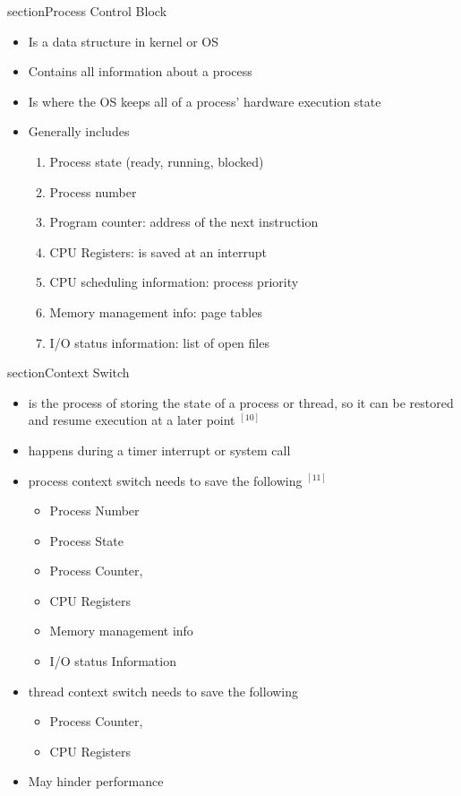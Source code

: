 \documentclass[12pt]{article}
\begin{document}
\*section{Process Control Block}

\begin{itemize}
    \item Is a data structure in kernel or OS
    \item Contains all information about a process
    \item Is where the OS keeps all of a process' hardware execution state
    \item Generally includes

    \begin{enumerate}[1.]
        \item Process state (ready, running, blocked)
        \item Process number
        \item Program counter: address of the next instruction
        \item CPU Registers: is saved at an interrupt
        \item CPU scheduling information: process priority
        \item Memory management info: page tables
        \item I/O status information: list of open files
    \end{enumerate}
\end{itemize}

\*section{Context Switch}

\begin{itemize}
    \item is the process of storing the state of a process or thread,
    so it can be restored and resume execution at a later point $^{[10]}$
    \item happens during a timer interrupt or system call
    \item process context switch needs to save the following $^{[11]}$

    \begin{itemize}
        \item Process Number
        \item Process State
        \item Process Counter,
        \item CPU Registers
        \item Memory management info
        \item I/O status Information
    \end{itemize}

    \item thread context switch needs to save the following

    \begin{itemize}
        \item Process Counter,
        \item CPU Registers
    \end{itemize}

    \item May hinder performance
\end{itemize}
\end{document}
